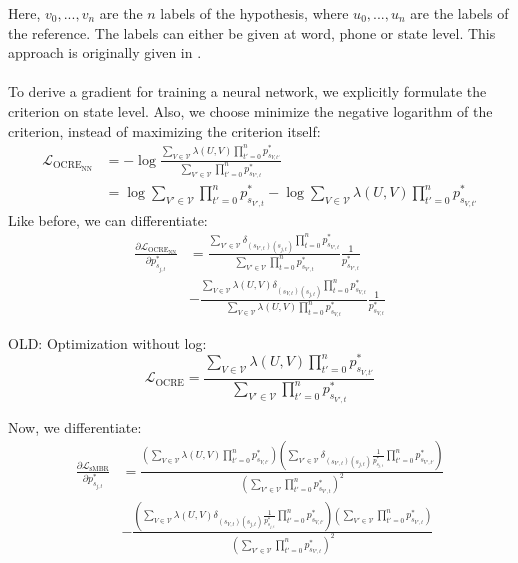 Here, $v_0,...,v_n$ are the $n$ labels of the hypothesis, where $u_0,...,u_n$ are the labels of the reference. The labels can either be given at word, phone or state level. This approach is originally given in \cite{povey2002minimum}. \\ \\
To derive a gradient for training a neural network, we explicitly formulate the criterion on state level. Also, we choose minimize the negative logarithm of the criterion, instead of maximizing the criterion itself: 
\begin{align*}
\mathcal{L}_{\text{OCRE}_\text{NN}} &= -\log \frac{\sum_{V \in \mathcal{V}}\lambda(U,V)\prod_{t' = 0}^{n} p^*_{s_{V,t'}}}{\sum_{V' \in \mathcal{V}} \prod_{t' = 0}^{n} p^*_{s_{V',t}}} \\ 
&= \log \sum_{V' \in \mathcal{V}} \prod_{t' = 0}^{n} p^*_{s_{V',t}} -\log \sum_{V \in \mathcal{V}}\lambda(U,V)\prod_{t' = 0}^{n} p^*_{s_{V,t'}}  
\end{align*}
Like before, we can differentiate:
\begin{align*}
\frac{\partial\mathcal{L}_{\text{OCRE}_\text{NN}}}{\partial p^*_{s_{j,t}}} &= 
\frac{ \sum_{V' \in \mathcal{V}} \delta_{(s_{V',t})(s_{j,t})} \prod_{t = 0}^{n} p^*_{s_{V',t}}}{\sum_{V' \in \mathcal{V}} \prod_{t = 0}^{n} p^*_{s_{V',t}}}\frac{1}{p^*_{s_{V',t}}} \\
&- \frac{ \sum_{V \in \mathcal{V}}\lambda(U,V) \delta_{(s_{V,t})(s_{j,t})} \prod_{t = 0}^{n} p^*_{s_{V,t}}}{\sum_{V \in \mathcal{V}}\lambda(U,V) \prod_{t = 0}^{n} p^*_{s_{V,t}}}\frac{1}{p^*_{s_{V,t}}}
\end{align*}

OLD: Optimization without log: 
\[
\mathcal{L}_{\text{OCRE}} = \frac{\sum_{V \in \mathcal{V}}\lambda(U,V)\prod_{t' = 0}^{n} p^*_{s_{V,t'}}}{\sum_{V' \in \mathcal{V}} \prod_{t' = 0}^{n} p^*_{s_{V',t}}} 
\]
\iffalse
Derivative of the P stuff: 
\begin{align*}
\frac{\partial \prod_{t' = 0}^{n} p^*_{s_{V,t'}}}{\partial p^*_{s_{j,t}}} &= \delta_{(s_{V,t})(s_{j,t})} \frac{1}{p^*_{s_{j,t}}} \prod_{t' = 0}^{n} p^*_{s_{V,t'}} \\
\end{align*}
\fi
Now, we differentiate:
\begin{align*}
\frac{\partial\mathcal{L}_{\text{sMBR}}}{\partial p^*_{s_{j,t}}} &= \frac{(\sum_{V \in \mathcal{V}}\lambda(U,V)\prod_{t' = 0}^{n} p^*_{s_{V,t'}})(\sum_{V' \in \mathcal{V}}\delta_{(s_{V',t})(s_{j,t})} \frac{1}{p^*_{s_{j,t}}} \prod_{t' = 0}^{n} p^*_{s_{V',t'}})}{(\sum_{V' \in \mathcal{V}} \prod_{t' = 0}^{n} p^*_{s_{V',t}})^2}  \\
&- \frac{(\sum_{V \in \mathcal{V}}\lambda(U,V)\delta_{(s_{V,t})(s_{j,t})} \frac{1}{p^*_{s_{j,t}}} \prod_{t' = 0}^{n} p^*_{s_{V,t'}})(\sum_{V' \in \mathcal{V}} \prod_{t' = 0}^{n} p^*_{s_{V',t}})}{(\sum_{V' \in \mathcal{V}} \prod_{t' = 0}^{n} p^*_{s_{V',t}})^2} 
\end{align*}
